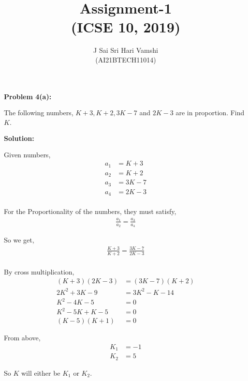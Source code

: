 \documentclass[journal,12pt,twocolumn]{article}\usepackage[margin=1.25 in]{geometry}
\title{\LARGE{\textbf{Assignment-1}\\(ICSE 10, 2019)}}
\author{\normalsize J Sai Sri Hari Vamshi\\ \footnotesize (AI21BTECH11014)}
\date{}
\begin{document}
\maketitle

\begin{center}
    \textbf{\large Problem 4(a):}
\end{center}
\begin{flushleft}
The following numbers, $K + 3, K + 2, 3K - 7$ and $2K - 3$ are in proportion. Find $K$.\\[2\baselineskip]
\end{flushleft}
\begin{center}
    \textbf{\large Solution:}
\end{center}

\noindent Given numbers,
\begin{align*}
a_1 & = K + 3\\
a_2 & = K + 2\\
a_3 & = 3K - 7\\
a_4 & = 2K - 3\\
\end{align*}

\noindent For the Proportionality of the numbers, they must satisfy,
\begin{align*}
	\frac{a_1}{a_2} = \frac{a_3}{a_4}
\end{align*}

\noindent So we get,
\begin{align*}
	\frac{K + 3}{K + 2} = \frac{3K - 7}{2K - 3}\\
\end{align*}

\noindent By cross multiplication,
\begin{align*}
    (K + 3)(2K - 3) & = (3K - 7)(K + 2)\\
    2K^2 + 3K - 9 & = 3K^2 - K - 14\\
    K^2 - 4K - 5 & = 0\\
    K^2 - 5K + K - 5 & = 0\\
    (K - 5)(K + 1) & = 0
\end{align*}

\noindent From above,
\begin{align*}
	K_1 & = -1\\
	K_2 & = 5
\end{align*}

\noindent So $K$ will either be $K_1$ or $K_2$.\\
\end{document}
